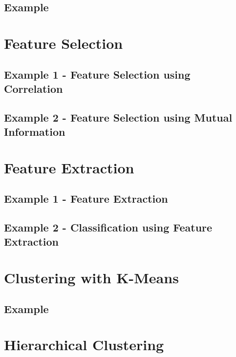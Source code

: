 \documentclass[10pt,twoside,a4paper,openany]{memoir}
\begin{document}
\section{Example}



\chapter{Feature Selection}

\section{Example 1 - Feature Selection using Correlation}


\newpage
\section{Example 2 - Feature Selection using Mutual Information}



\chapter{Feature Extraction}

\section{Example 1 - Feature Extraction}


\newpage
\section{Example 2 - Classification using Feature Extraction}



\chapter{Clustering with K-Means}

\section{Example}



\chapter{Hierarchical Clustering}
\end{document}
